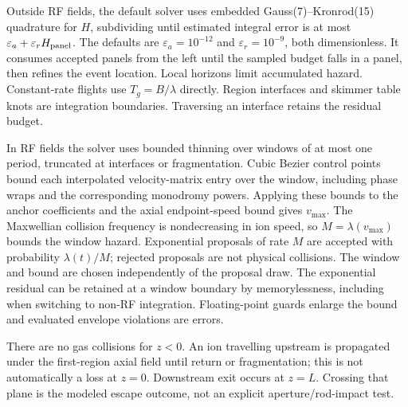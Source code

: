 \documentclass[10pt,a4paper]{article}
\begin{document}
Outside RF fields, the default solver uses embedded Gauss(7)--Kronrod(15) quadrature
for $H$, subdividing until estimated integral error is at most
$\varepsilon_a+\varepsilon_r H_{\rm panel}$. The defaults are
$\varepsilon_a=10^{-12}$ and $\varepsilon_r=10^{-9}$, both dimensionless.
It consumes accepted panels from the left until the sampled budget falls in a
panel, then refines the event location. Local horizons limit accumulated hazard. Constant-rate flights
use $T_g=B/\lambda$ directly. Region interfaces and skimmer table knots are
integration boundaries. Traversing an interface retains the residual budget.

In RF fields the solver uses bounded thinning over windows of at most one
period, truncated at interfaces or fragmentation. Cubic Bezier control points
bound each interpolated velocity-matrix entry over the window, including phase
wraps and the corresponding monodromy powers. Applying these bounds to the
anchor coefficients and the axial endpoint-speed bound gives $v_{\max}$.
The Maxwellian collision frequency is nondecreasing in ion speed, so
$M=\lambda(v_{\max})$ bounds the window hazard. Exponential proposals of rate
$M$ are accepted with probability $\lambda(t)/M$; rejected proposals are not
physical collisions. The window and bound are chosen independently of the
proposal draw. The exponential residual can be retained at a window boundary
by memorylessness, including when switching to non-RF integration. Floating-point
guards enlarge the bound and evaluated envelope violations are errors.

There are no gas collisions for $z<0$. An ion travelling upstream is propagated
under the first-region axial field until return or fragmentation; this is not
automatically a loss at $z=0$. Downstream exit occurs at $z=L$. Crossing that
plane is the modeled escape outcome, not an explicit aperture/rod-impact test.

\clearpage
\end{document}
